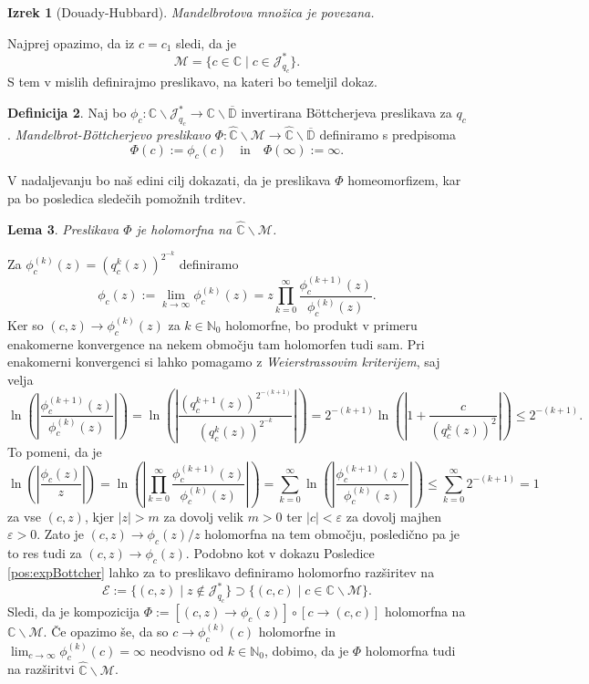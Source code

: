 \documentclass[12pt,a4paper]{amsart}
\theoremstyle{definition} %
\newtheorem{definicija}{Definicija}[section]
\theoremstyle{plain} %
\newtheorem{lema}[definicija]{Lema}
\newtheorem{izrek}[definicija]{Izrek}
\newcommand{\N}{\mathbb N}
\newcommand{\CC}{\mathbb C}
\newcommand{\CCinf} {\hat{\CC}} %
\newcommand{\D}{\mathbb D} %
\newcommand{\M}{\mathscr M} %
\newcommand{\J}{\mathscr J} %
\newcommand{\E}{\mathscr E} %
\begin{document}
\begin{izrek}[Douady-Hubbard]\label{izr:DouadyHubbard}
Mandelbrotova množica je povezana.
\end{izrek}

\proof
Najprej opazimo, da iz $c = c_1$ sledi, da je 
$$\M = \{c \in \CC \mid c \in \J_{q_c}^\ast\}.$$
S tem v mislih definirajmo preslikavo, na kateri bo temeljil dokaz.

\begin{definicija}\label{def:MandelBottcher}
Naj bo $\phi_c \colon \CC \smallsetminus \J_{q_c}^\ast \to \CC \smallsetminus \overline{\D}$
invertirana B{\"o}ttcherjeva preslikava za $q_c$.
{\em Mandelbrot-B{\"o}ttcherjevo preslikavo} 
$\Phi \colon \CCinf \smallsetminus \M \to \CCinf \smallsetminus \overline{\D}$ 
definiramo s predpisoma
$$\Phi(c) := \phi_c(c) \quad \text{in} \quad \Phi(\infty) := \infty.$$
\end{definicija}

V nadaljevanju bo naš edini cilj dokazati, da je preslikava $\Phi$ homeomorfizem,
kar pa bo posledica sledečih pomožnih trditev.

\begin{lema}\label{lem:holMandelBottcher}
Preslikava $\Phi$ je holomorfna na $\CCinf \smallsetminus  \M$.
\end{lema}

\proof
Za $\phi_c^{(k)}(z) = (q_c^k(z))^{2^{-k}}$ definiramo
$$\phi_c(z) := \lim_{k\to\infty}\phi_c^{(k)} (z) = z\prod_{k=0}^\infty \frac{\phi_c^{(k+1)}(z)}{\phi_c^{(k)}(z)}.$$
Ker so $(c, z) \to \phi_c^{(k)}(z)$ za $k\in\N_0$ holomorfne, 
bo produkt v primeru enakomerne konvergence na nekem območju tam holomorfen tudi sam.
Pri enakomerni konvergenci si lahko pomagamo z {\em Weierstrassovim kriterijem}, saj velja
$$
\ln\left(\left|\frac{\phi_c^{(k+1)}(z)}{\phi_c^{(k)}(z)}\right|\right) 
= \ln\left(\left|\frac{(q_c^{k+1}(z))^{2^{-(k+1)}}}{(q_c^{k}(z))^{2^{-k}}}\right|\right) 
= 2^{-(k+1)} \ln\left(\left|1 + \frac{c}{(q_c^k(z))^2}\right|\right)
\leq 2^{-(k+1)}.
$$
To pomeni, da je
$$
\ln\left(\left|\frac{\phi_c(z)}{z}\right|\right)
= \ln\left(\left|\prod_{k=0}^\infty \frac{\phi_c^{(k+1)}(z)}{\phi_c^{(k)}(z)}\right|\right)
= \sum_{k=0}^\infty\ln\left(\left|\frac{\phi_c^{(k+1)}(z)}{\phi_c^{(k)}(z)}\right|\right) 
\leq \sum_{k=0}^\infty 2^{-(k+1)} = 1
$$ 
za vse $(c, z)$, kjer $|z| > m$ za dovolj velik $m > 0$ ter $|c| < \varepsilon$ za dovolj majhen $\varepsilon > 0$.
Zato je $(c, z) \to \phi_c(z)/z$ holomorfna na tem območju, posledično pa je to res tudi za $(c, z) \to \phi_c(z)$.
Podobno kot v dokazu Posledice \ref{pos:expBottcher} lahko za to preslikavo definiramo holomorfno razširitev na
$$\E := \{(c, z) \mid z \notin \J_{q_c}^\ast\} \supset \{(c, c) \mid c\in \CC \smallsetminus \M\}.$$
Sledi, da je kompozicija $\Phi := [(c, z) \to \phi_c(z)] \circ [c \to (c, c)]$ holomorfna na $\CC \smallsetminus \M$.
Če opazimo še, da so $c \to \phi^{(k)}_c(c)$ holomorfne in $\lim_{c\to\infty}\phi_c^{(k)}(c) = \infty$ 
neodvisno od $k\in\N_0$, dobimo, da je $\Phi$ holomorfna tudi na razširitvi $\CCinf \smallsetminus \M$.
\endproof
\end{document}
